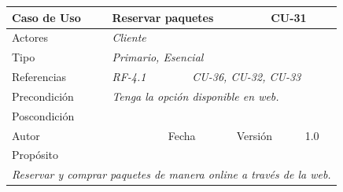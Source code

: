 \begin{table}[H]
    \begin{tabular}{|llllllll|}
    \hline
    \multicolumn{1}{|l|}{Caso de Uso}       & \multicolumn{5}{l|}{Reservar paquetes}                                                                         & \multicolumn{2}{l|}{\cellcolor[HTML]{E6E6E6}CU-31}          \\ \hline
    \multicolumn{1}{|l|}{Actores}           & \multicolumn{7}{l|}{{\color[HTML]{808080} \textit{Cliente}}}                                                                                                                           \\ \hline
    \multicolumn{1}{|l|}{Tipo}              & \multicolumn{7}{l|}{{\color[HTML]{808080} \textit{Primario, Esencial}}}                                                                                                                \\ \hline
    \multicolumn{1}{|l|}{Referencias}       & \multicolumn{2}{l|}{{\color[HTML]{808080} \textit{RF-4.1}}}              & \multicolumn{5}{l|}{{\color[HTML]{808080} \textit{CU-36, CU-32, CU-33}}}                                    \\ \hline
    \multicolumn{1}{|l|}{Precondición}      & \multicolumn{7}{l|}{{\color[HTML]{808080} \textit{Tenga la opción disponible en web.}}}                                                                                                \\ \hline
    \multicolumn{1}{|l|}{Poscondición}      & \multicolumn{7}{l|}{}                                                                                                                                                                  \\ \hline
    \multicolumn{1}{|l|}{Autor}             & \multicolumn{1}{l|}{}                        & \multicolumn{2}{l|}{Fecha}           & \multicolumn{1}{l|}{}     & \multicolumn{2}{l|}{Versión}         & 1.0                           \\ \hline
    \multicolumn{8}{|l|}{\cellcolor[HTML]{F2F2F2}Propósito}                                                                                                                                                                          \\ \hline
    \multicolumn{8}{|p{15cm}|}{{\color[HTML]{808080} \textit{Reservar y comprar paquetes de manera online a través de la web.}}}                                                                                                           \\ \hline

\end{tabular}
\end{table}
